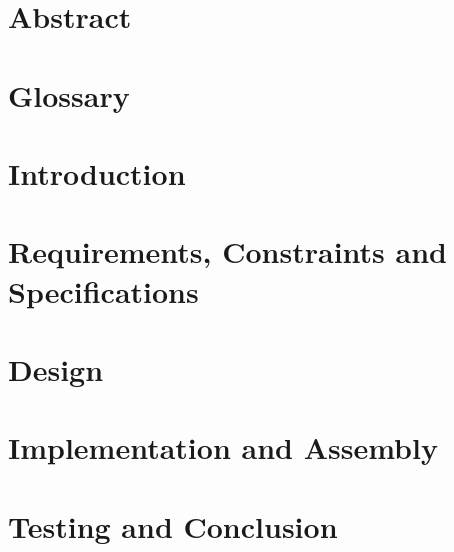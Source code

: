 \documentclass[12pt]{article}
\begin{document}
	
	
	\setcounter{page}{0}
	\newpage
	
	\section*{Abstract}
	
	\pagebreak
	
	\tableofcontents
	\pagebreak
	
	\listoffigures
	\pagebreak
	\listoftables
	\pagebreak
	\section*{Glossary}
	
	\pagebreak
	
	\section{Introduction}
	\label{sec:intro}
	
	\pagebreak
	
	\section{Requirements, Constraints and Specifications}
	\label{sec:requirements}
	
	\pagebreak
	
	\section{Design}
	\label{sec:design}
	
	\pagebreak
	
 	\section{Implementation and Assembly}
 	\label{sec:implementation}
	
	\pagebreak
	
	\section{Testing and Conclusion}
	\label{sec:calibration}
	
	\pagebreak
	
	\printbibliography
	\pagebreak
	
	\appendix
	

	
\end{document}
